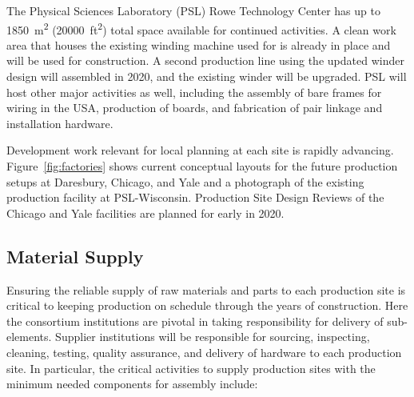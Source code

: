 The Physical Sciences Laboratory (PSL) Rowe Technology Center has up to \SI{1850}{m^2} (\SI{20000}{ft^2}) total space available for continued  activities.  A clean work area that houses the existing winding machine used for  is already in place and will be used for   construction. A second  production line using the updated winder design will assembled in 2020, and the existing winder will be upgraded.  PSL will host other major activities as well, including the assembly of bare  frames for wiring in the USA, production of  boards, and fabrication of  pair linkage and installation hardware.

Development work relevant for local planning at each site is rapidly advancing.  Figure~\ref{fig:factories} shows current conceptual layouts for the future production setups at Daresbury, Chicago, and Yale and a photograph of the existing  production facility at PSL-Wisconsin.  Production Site Design Reviews of the Chicago and Yale facilities are planned for early in 2020. %
 

\subsection{Material Supply}  
\label{sec:fdsp-apa-prod-supply}

Ensuring the reliable supply of raw materials and parts to each  production site is critical to keeping  production on schedule through the years of construction. Here the consortium institutions are pivotal in taking responsibility for delivery of  sub-elements. Supplier institutions will be responsible for sourcing, inspecting, cleaning, testing, quality assurance, and delivery of hardware to each production site.  In particular, the critical activities to supply production sites with the minimum needed  components for assembly include:

